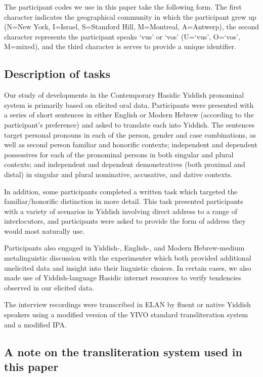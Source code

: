 \documentclass[output=paper, hidelinks]{langscibook}
\begin{document}
The participant codes we use in this paper take the following form. The first character indicates the geographical community in which the participant grew up (N=New York, I=Israel, S=Stamford Hill, M=Montreal, A=Antwerp), the second character represents the participant speaks `vus' or `vos' (U=`vus', O=`vos', M=mixed), and the third character is serves to provide a unique identifier. 


\subsection{Description of tasks}

Our study of developments in the Contemporary Hasidic Yiddish pronominal system is primarily based on elicited oral data. Participants were presented with a series of short sentences in either English or Modern Hebrew (according to the participant's preference) and asked to translate each into Yiddish. The sentences target personal pronouns in each of the person, gender and case combinations, as well as second person familiar and honorific contexts; independent and dependent possessives for each of the pronominal persons in both singular and plural contexts; and independent and dependent demonstratives (both proximal and distal) in singular and plural nominative, accusative, and dative contexts. 

In addition, some participants completed a written task which targeted the familiar/honorific distinction in more detail. This task presented participants with a variety of scenarios in Yiddish involving direct address to a range of interlocutors, and participants were asked to provide the form of address they would most naturally use. 

Participants also engaged in Yiddish-, English-, and Modern Hebrew-medium metalinguistic discussion with the experimenter which both provided additional unelicited data and insight into their linguistic choices. In certain cases, we also made use of Yiddish-language Hasidic internet resources to verify tendencies observed in our elicited data. 

The interview recordings were transcribed in ELAN by fluent or native Yiddish speakers using a modified version of the YIVO standard transliteration system and a modified IPA. 

\subsection{A note on the transliteration system used in this paper}
\end{document}
